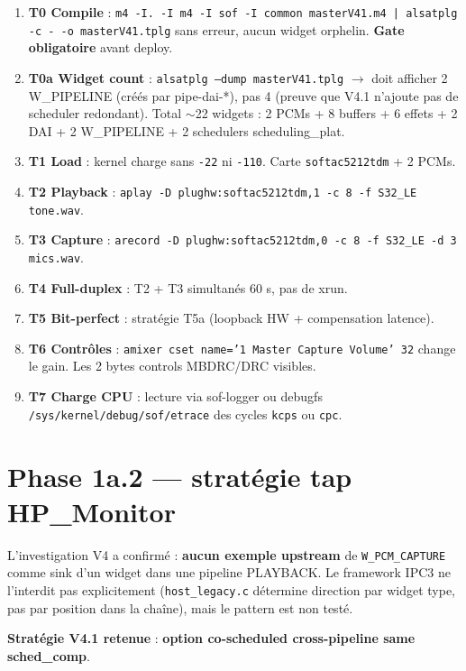 \documentclass[11pt,a4paper]{article}
\begin{document}
\begin{enumerate}[leftmargin=*, itemsep=2pt]
  \item \textbf{T0 Compile} : \texttt{m4 -I. -I m4 -I sof -I common masterV41.m4 | alsatplg -c - -o masterV41.tplg} sans erreur, aucun widget orphelin. \textbf{Gate obligatoire} avant deploy.
  \item \textbf{T0a Widget count} : \texttt{alsatplg --dump masterV41.tplg} $\to$ doit afficher 2 W\_PIPELINE (créés par pipe-dai-*), pas 4 (preuve que V4.1 n'ajoute pas de scheduler redondant). Total $\sim$22 widgets : 2 PCMs + 8 buffers + 6 effets + 2 DAI + 2 W\_PIPELINE + 2 schedulers scheduling\_plat.
  \item \textbf{T1 Load} : kernel charge sans \texttt{-22} ni \texttt{-110}. Carte \texttt{softac5212tdm} + 2 PCMs.
  \item \textbf{T2 Playback} : \texttt{aplay -D plughw:softac5212tdm,1 -c 8 -f S32\_LE tone.wav}.
  \item \textbf{T3 Capture} : \texttt{arecord -D plughw:softac5212tdm,0 -c 8 -f S32\_LE -d 3 mics.wav}.
  \item \textbf{T4 Full-duplex} : T2 + T3 simultanés 60 s, pas de xrun.
  \item \textbf{T5 Bit-perfect} : stratégie T5a (loopback HW + compensation latence).
  \item \textbf{T6 Contrôles} : \texttt{amixer cset name='1 Master Capture Volume' 32} change le gain. Les 2 bytes controls MBDRC/DRC visibles.
  \item \textbf{T7 Charge CPU} : lecture via sof-logger ou debugfs \texttt{/sys/kernel/debug/sof/etrace} des cycles \texttt{kcps} ou \texttt{cpc}.
\end{enumerate}

\section{Phase 1a.2 --- stratégie tap HP\_Monitor}

L'investigation V4 a confirmé : \textbf{aucun exemple upstream} de \texttt{W\_PCM\_CAPTURE} comme sink d'un widget dans une pipeline PLAYBACK. Le framework IPC3 ne l'interdit pas explicitement (\texttt{host\_legacy.c} détermine direction par widget type, pas par position dans la chaîne), mais le pattern est non testé.

\textbf{Stratégie V4.1 retenue} : \textbf{option co-scheduled cross-pipeline same sched\_comp}.
\end{document}
